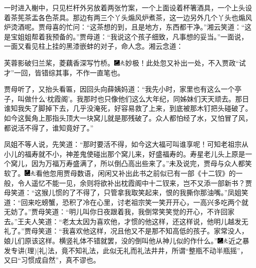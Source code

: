 一时进入榭中，只见栏杆外另放着两张竹案，一个上面设着杯箸酒具，一个上头设着茶筅茶盂各色茶具。那边有两三个丫头煽风炉煮茶，这一边另外几个丫头也煽风炉烫酒呢。贾母喜的忙问：“这茶想的到，且是地方，东西都干净。”湘云笑道：“这是宝姐姐帮着我预备的。”贾母道：“我说这个孩子细致，凡事想的妥当。”一面说，一面又看见柱上挂的黑漆嵌蚌的对子，命人念。湘云念道：

芙蓉影破归兰桨，菱藕香深写竹桥。{\includegraphics[width=3mm]{../Images/00003}\includegraphics[width=3mm]{../Images/00012}\footnotesize \kaishu 妙极！此处忽又补出一处，不入贾政“试才”一回，皆错综其事，不作一直笔也。}

贾母听了，又抬头看匾，因回头向薛姨妈道：“我先小时，家里也有这么一个亭子，叫做什么‘枕霞阁’。我那时也只像他们这么大年纪，同姊妹们天天顽去。那日谁知我失了脚掉下去，几乎没淹死，好容易救了上来，到底被那木钉把头碰破了。如今这鬓角上那指头顶大一块窝儿就是那残破了。众人都怕经了水，又怕冒了风，都说活不得了，谁知竟好了。”

凤姐不等人说，先笑道：“那时要活不得，如今这大福可叫谁享呢！可知老祖宗从小儿的福寿就不小，神差鬼使碰出那个窝儿来，好盛福寿的。寿星老儿头上原是一个窝儿，因为万福万寿盛满了，所以倒凸高出些来了。”未及说完，贾母与众人都笑软了。{\includegraphics[width=3mm]{../Images/00003}\includegraphics[width=3mm]{../Images/00012}\footnotesize \kaishu 看他忽用贾母数语，闲闲又补出此书之前似已有一部《十二钗》的一般，令人遥忆不能一见，余则将欲补出枕霞阁中十二钗来，岂不又添一部新书？}贾母笑道：“这猴儿惯的了不得了，只管拿我取笑起来，恨的我撕你那油嘴。”凤姐笑道：“回来吃螃蟹，恐积了冷在心里，讨老祖宗笑一笑开开心，一高兴多吃两个就无妨了。”贾母笑道：“明儿叫你日夜跟着我，我倒常笑笑觉的开心，不许回家去。”王夫人笑道：“老太太因为喜欢他，才惯的他这样，还这样说，他明儿越发无礼了。”贾母笑道：“我喜欢他这样，况且他又不是那不知高低的孩子。家常没人，娘儿们原该这样。横竖礼体不错就罢，没的倒叫他从神儿似的作什么。”{\includegraphics[width=3mm]{../Images/00003}\includegraphics[width=3mm]{../Images/00012}\footnotesize \kaishu 近之暴发专讲{(理)}{[}礼{]}法，竟不知礼法，此似无礼而礼法井井，所谓“整瓶不动半瓶摇”，又曰“习惯成自然”，真不谬也。}

